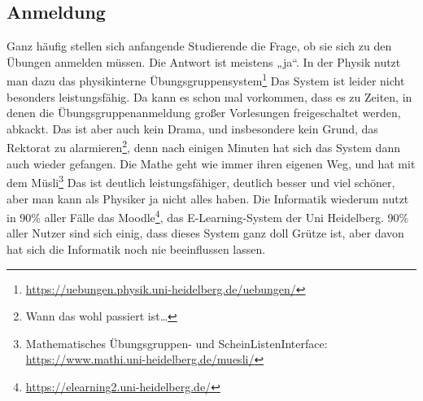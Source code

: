 \subsection{Anmeldung}
Ganz häufig stellen sich anfangende Studierende die Frage, ob sie sich zu den
Übungen anmelden müssen. Die Antwort ist meistens „ja“.
In der Physik nutzt man dazu das physikinterne Übungsgruppensystem\footnote{\url{https://uebungen.physik.uni-heidelberg.de/uebungen/}}
Das System ist leider nicht besonders leistungsfähig. Da kann es schon mal
vorkommen, dass es zu Zeiten, in denen die Übungsgruppenanmeldung großer
Vorlesungen freigeschaltet werden, abkackt. Das ist aber auch kein Drama, und
insbesondere kein Grund, das Rektorat zu alarmieren\footnote{Wann das wohl
passiert ist…}, denn nach einigen Minuten hat sich das System dann auch wieder
gefangen.
Die Mathe geht wie immer ihren eigenen Weg, und hat mit dem Müsli\footnote{Mathematisches Übungsgruppen- und ScheinListenInterface:\\ \url{https://www.mathi.uni-heidelberg.de/muesli/}}
Das ist deutlich leistungsfähiger, deutlich besser und viel schöner, aber man
kann als Physiker ja nicht alles haben.
Die Informatik wiederum nutzt in 90\% aller Fälle das Moodle\footnote{\url{https://elearning2.uni-heidelberg.de/}}, das E-Learning-System der Uni Heidelberg.
90\% aller Nutzer sind sich einig, dass dieses System ganz doll Grütze ist, aber
davon hat sich die Informatik noch nie beeinflussen lassen.
